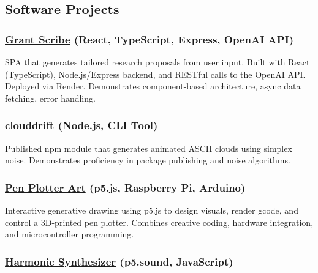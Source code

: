 \documentclass[11pt,a4paper]{article}
\begin{document}
\subsection{Software Projects}\label{software-projects}

\subsubsection{\texorpdfstring{\href{https://granter.onrender.com/}{Grant
Scribe} (React, TypeScript, Express, OpenAI
API)}{Grant Scribe (React, TypeScript, Express, OpenAI API)}}\label{grant-scribe-react-typescript-express-openai-api}

SPA that generates tailored research proposals from user input. Built
with React (TypeScript), Node.js/Express backend, and RESTful calls to
the OpenAI API. Deployed via Render. Demonstrates component-based
architecture, async data fetching, error handling.

\subsubsection{\texorpdfstring{\href{https://github.com/thrly/clouddrift}{clouddrift}
(Node.js, CLI
Tool)}{clouddrift (Node.js, CLI Tool)}}\label{clouddrift-node.js-cli-tool}

Published npm module that generates animated ASCII clouds using simplex
noise. Demonstrates proficiency in package publishing and noise
algorithms.

\subsubsection{\texorpdfstring{\href{https://github.com/thrly/pen-plotter-resources}{Pen
Plotter Art} (p5.js, Raspberry Pi,
Arduino)}{Pen Plotter Art (p5.js, Raspberry Pi, Arduino)}}\label{pen-plotter-art-p5.js-raspberry-pi-arduino}

Interactive generative drawing using p5.js to design visuals, render
gcode, and control a 3D-printed pen plotter. Combines creative coding,
hardware integration, and microcontroller programming.

\subsubsection{\texorpdfstring{\href{https://github.com/thrly/harmonic-series-synth}{Harmonic
Synthesizer} (p5.sound,
JavaScript)}{Harmonic Synthesizer (p5.sound, JavaScript)}}\label{harmonic-synthesizer-p5.sound-javascript}
\end{document}
